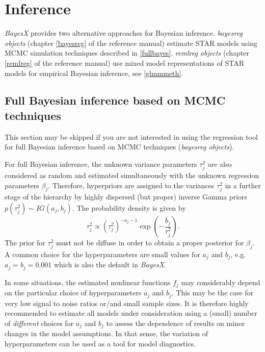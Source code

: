 \documentclass[11pt,a4paper,twoside]{bayesxarticle}
\begin{document}
\section{Inference}
\label{inference}

{\em BayesX} provides two alternative approaches for Bayesian
inference. {\em bayesreg objects} (chapter \ref*{bayesreg} of the
reference manual) estimate STAR models using MCMC simulation
techniques described in \autoref{fullbayes}. {\em remlreg objects}
(chapter \ref*{remlreg} of the reference manual) use mixed model
representations of STAR models for empirical Bayesian inference, see
\autoref{glmmmeth}.



\subsection{Full Bayesian inference based on MCMC techniques}
\label{fullbayes}

This section may be skipped if you are not interested in using the
regression tool for full Bayesian inference based on MCMC techniques
({\em bayesreg objects}).

For full Bayesian inference, the unknown variance parameters
$\tau_j^2$ are also considered as random and estimated
simultaneously with the unknown regression parameters $\beta_j$.
Therefore, hyperpriors are assigned to the variances $\tau^2_j$
in a further stage of the hierarchy by highly dispersed (but
proper) inverse Gamma priors $p(\tau^2_j) \sim IG(a_j,b_j)$. The
probability density is given by
$$
\tau_j^2 \propto (\tau^2_j)^{-a_j-1}
\exp\left(-\frac{b_j}{\tau^2_j}\right).
$$
The prior for $\tau_j^2$ must not be diffuse in order to obtain a
proper posterior for $\beta_j$. A common choice for the
hyperparameters are small values for $a_j$ and $b_j$, e.g.
$a_j=b_j=0.001$ which is also the default in {\em BayesX}.

In some situations, the estimated nonlinear functions $f_j$ may
considerably depend on the particular choice of hyperparameters
$a_j$ and $b_j$. This may be the case for very low signal to noise
ratios or/and small sample sizes. It is therefore highly
recommended to estimate all models under consideration using a
(small) number of {\em different} choices for $a_j$ and $b_j$ to
assess the dependence of results on minor changes in the model
assumptions. In that sense, the variation of hyperparameters can
be used as a tool for model diagnostics.
\end{document}
